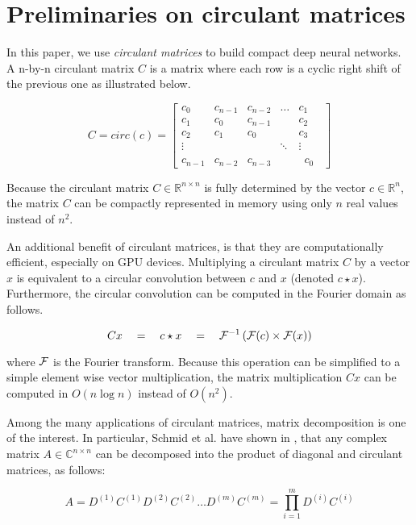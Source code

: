 \documentclass[runningheads]{llncs}
\newcommand{\F}{{\ensuremath \mathcal F}}
\begin{document}
\section{Preliminaries on circulant matrices}
\label{sec:circ}

In this paper, we use {\em circulant matrices} to build compact deep neural networks. A n-by-n circulant matrix $C$ is a matrix where each row is a cyclic right shift of the previous one as illustrated below.

\[
C = circ(c) =\left[\begin{array}{ccccc}
c_{0} & c_{n-1} & c_{n-2} & \dots & c_{1} \\
c_{1} & c_{0} & c_{n-1} & & c_{2} \\
c_{2} & c_{1} & c_{0}& & c_{3} \\
\vdots & & & \ddots & \vdots \\
c_{n-1} & c_{n-2} & c_{n-3} & & \phantom{0}c_{0}\phantom{0}
\end{array}\right]
\]

Because the circulant matrix $C \in \mathbb R^{n\times n}$ is fully determined by the vector $c \in \mathbb R^n$, the matrix $C$ can be compactly represented in memory using only $n$ real values instead of $n^2$.

An additional benefit of circulant matrices, is that they are computationally efficient, especially on GPU devices. Multiplying a circulant matrix $C$ by a vector $x$ is equivalent to a circular convolution between $c$ and $x$ (denoted $c \star x$). Furthermore, the circular convolution can be computed in the Fourier domain as follows.

\begin{equation*}
  Cx \quad = \quad c \star x \quad = \quad \F^{-1}\left(\F(c) \times \F(x)\right)
\end{equation*}

\noindent where $\F$ is the Fourier transform. Because this operation can be simplified to a simple element wise vector multiplication, the matrix multiplication $Cx$ can be computed in $O(n \log n)$ instead of $O(n^2)$.

Among the many applications of circulant matrices, matrix decomposition is one of the interest. In particular, Schmid et al. have shown in \cite{muller1998algorithmic,schmid2000decomposing}, that any complex matrix $A \in \mathbb C^{n\times n}$ can be decomposed into the product of diagonal and circulant matrices, as follows:

\begin{equation}\label{eq:general_framework}
  A = D^{(1)} C^{(1)} D^{(2)} C^{(2)} \dots D^{(m)} C^{(m)} = \prod_{i=1}^{m} D^{(i)} C^{(i)}
\end{equation}
\end{document}
